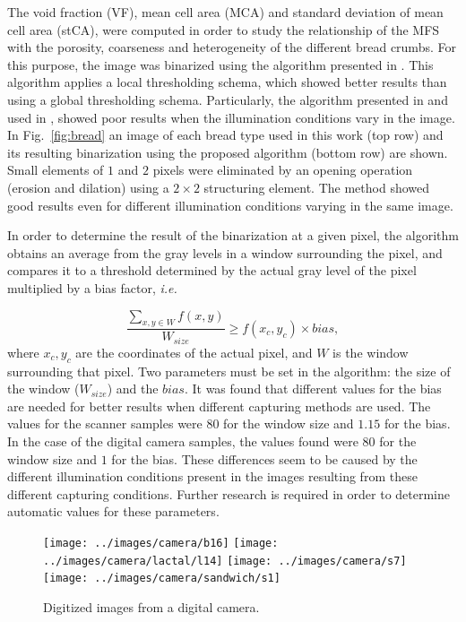 The void fraction (VF), mean cell area (MCA) and standard deviation of mean cell area (stCA), were computed in order to study the relationship of the MFS with the porosity, coarseness and heterogeneity of the different bread crumbs. For this purpose, the image was binarized using the algorithm presented in \cite{White83}. This algorithm applies a local thresholding schema, which showed better results than using a global thresholding schema. Particularly, the algorithm presented in \cite{Huang95} and used in \cite{Gonzales2008}, showed poor results when the illumination conditions vary in the image. In Fig.~\ref{fig:bread} an image of each bread type used in this work (top row) and its resulting binarization using the proposed algorithm (bottom row) are shown. Small elements of $1$ and $2$ pixels were eliminated by an opening operation (erosion and dilation) using a $2\times2$ structuring element. The method showed good results even for different illumination conditions varying in the same image. 

In order to determine the result of the binarization at a given pixel, the algorithm obtains an average from the gray levels in a window surrounding the pixel, and compares it to a threshold determined by the actual gray level of the pixel multiplied by a bias factor, {\em i.e.}

\begin{equation}
\frac{\sum_{x,y \in W} f(x,y) }{W_{size}} \geq f(x_{c},y_{c}) \times bias,
\label{eqn:white}
\end{equation}
where $x_{c},y_{c}$ are the coordinates of the actual pixel, and $W$ is the window surrounding that pixel. Two parameters must be set in the algorithm: the size of the window ($W_{size}$) and the $bias$. It was found that different values for the bias are needed for better results when different capturing methods are used. The values for the scanner samples were $80$ for the window size and $1.15$ for the bias. In the case of the digital camera samples, the values found were $80$ for the window size and $1$ for the bias. These differences seem to be caused by the different illumination conditions present in the images resulting from these different capturing conditions. Further research is required in order to determine automatic values for these parameters.

\begin{figure}[htb]
\centering
\texttt{[image: ../images/camera/b16]}
\texttt{[image: ../images/camera/lactal/l14]}
\texttt{[image: ../images/camera/s7]}
\texttt{[image: ../images/camera/sandwich/s1]}
\caption{Digitized images from a digital camera.}
\label{fig:camera}
\end{figure}

